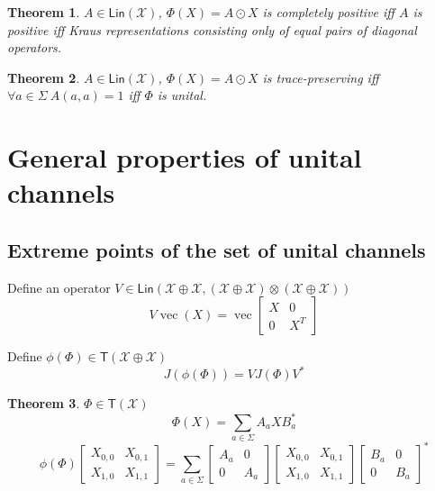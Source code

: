 \documentclass[aps,pra,onecolumn,notitlepage,superscriptaddress]{revtex4-1}
\newcommand{\spc}[1]{\mathcal{#1}}
\newcommand{\Lin}{\mathsf{Lin}}
\newcommand{\T}{\mathsf{T}}
\newcommand{\op}[1]{\operatorname{#1}}
\newtheorem{theo}{Theorem}
\begin{document}
    \begin{theo}
        $A \in \Lin(\spc X)$, $\Phi(X) = A \odot X$ is completely positive iff $A$ is positive iff Kraus representations consisting only of equal pairs of diagonal operators.
    \end{theo}

    \begin{theo}
        $A \in \Lin(\spc X)$, $\Phi(X) = A \odot X$ is trace-preserving iff $\forall a \in \Sigma \ A(a,a) = 1$ iff $\Phi$ is unital.
    \end{theo}

    \section{General properties of unital channels}
    \subsection{Extreme points of the set of unital channels}

    Define an operator $V \in \Lin(\spc X \oplus \spc X, (\spc X \oplus \spc X) \otimes (\spc X \oplus \spc X))$
    \begin{equation}
        V \op{vec}(X) = \op{vec} \begin{bmatrix}
            X & 0 \\
            0 & X^T
        \end{bmatrix}
    \end{equation}

    Define $\phi(\Phi) \in \T(\spc X \oplus \spc X)$
    \begin{equation}
        J(\phi(\Phi)) = VJ(\Phi)V^*
    \end{equation}

    \begin{theo}
        $\Phi \in \T(\spc X)$
        \begin{equation}
            \Phi(X) = \sum_{a \in \Sigma} A_a X B_a^*
        \end{equation}
        \begin{equation}
            \phi(\Phi) \begin{bmatrix}
                X_{0,0} & X_{0,1} \\
                X_{1,0} & X_{1,1}
            \end{bmatrix} = \sum_{a \in \Sigma}
            \begin{bmatrix}
                A_a & 0 \\
                0 & A_a
            \end{bmatrix}
            \begin{bmatrix}
                X_{0,0} & X_{0,1} \\
                X_{1,0} & X_{1,1}
            \end{bmatrix}
            \begin{bmatrix}
                B_a & 0 \\
                0 & B_a
            \end{bmatrix}^*
        \end{equation}
    \end{theo}
\end{document}
